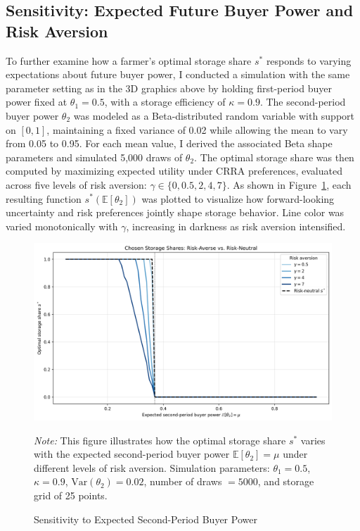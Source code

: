 \subsection{Sensitivity: Expected Future Buyer Power and Risk Aversion}
\noindent To further examine how a farmer's optimal storage share $s^*$ responds to varying expectations about future buyer power, I conducted a simulation with the same parameter setting as in the 3D graphics above by holding first-period buyer power fixed at $\theta_1 = 0.5$, with a storage efficiency of $\kappa = 0.9$. The second-period buyer power $\theta_2$ was modeled as a Beta-distributed random variable with support on $[0, 1]$, maintaining a fixed variance of 0.02 while allowing the mean to vary from 0.05 to 0.95. For each mean value, I derived the associated Beta shape parameters and simulated 5,000 draws of $\theta_2$. The optimal storage share was then computed by maximizing expected utility under CRRA preferences, evaluated across five levels of risk aversion: $\gamma \in \{0, 0.5, 2, 4, 7\}$. As shown in Figure~\ref{Figure: sensitivity to second-period buyer power}, each resulting function $s^*(\mathbb{E}[\theta_2])$ was plotted to visualize how forward-looking uncertainty and risk preferences jointly shape storage behavior. Line color was varied monotonically with $\gamma$, increasing in darkness as risk aversion intensified.

\begin{figure}[ht!]
\centering
\includegraphics[width=\textwidth]{model_figures/sensitivity_to_theta_2.png}
\caption{Sensitivity to Expected Second-Period Buyer Power}
\label{Figure: sensitivity to second-period buyer power}
    \begin{tablenotes}[flushleft]
    \footnotesize
    \item \textit{Note:} This figure illustrates how the optimal storage share $s^*$ varies with the expected second-period buyer power $\mathbb{E}[\theta_2]=\mu$ under different levels of risk aversion. 
    Simulation parameters: $\theta_1=0.5$, $\kappa=0.9$, $\mathrm{Var}(\theta_2)=0.02$, number of draws $=5000$, and storage grid of 25 points.
    \end{tablenotes}
\end{figure}


